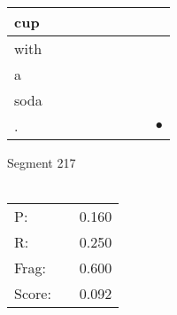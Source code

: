 \documentclass[landscape]{article}
\newcommand{\ssp}{\hspace{2pt}}
\newcommand{\mex}{\cellcolor{g}$\bullet$}
\begin{document}
\begin{tabular}{|l|p{10pt}|p{10pt}|p{10pt}|p{10pt}|p{10pt}|p{10pt}|p{10pt}|p{10pt}|}
\hline
\ssp cup \ssp&\hspace{2pt}&\hspace{2pt}&\hspace{2pt}&\hspace{2pt}&\hspace{2pt}&\hspace{2pt}&\hspace{2pt}&\hspace{2pt}\\
\hline
\ssp with \ssp&\hspace{2pt}&\hspace{2pt}&\hspace{2pt}&\hspace{2pt}&\hspace{2pt}&\hspace{2pt}&\hspace{2pt}&\hspace{2pt}\\
\hline
\ssp a \ssp&\hspace{2pt}&\hspace{2pt}&\hspace{2pt}&\hspace{2pt}&\hspace{2pt}&\hspace{2pt}&\hspace{2pt}&\hspace{2pt}\\
\hline
\ssp soda \ssp&\hspace{2pt}&\hspace{2pt}&\hspace{2pt}&\hspace{2pt}&\hspace{2pt}&\hspace{2pt}&\hspace{2pt}&\hspace{2pt}\\
\hline
\ssp \cellcolor{ref7}. \ssp&\hspace{2pt}&\hspace{2pt}&\hspace{2pt}&\hspace{2pt}&\hspace{2pt}&\hspace{2pt}&\hspace{2pt}&\hspace{2pt}\mex\\
\hline
\end{tabular}

\vspace{6pt}
\noindent Segment 217\\\\
\noindent\begin{tabular}{lm{12pt}r}
\hline
P:&&0.160\\
R:&&0.250\\
Frag:&&0.600\\
Score:&&0.092\\
\end{tabular}
\end{document}
